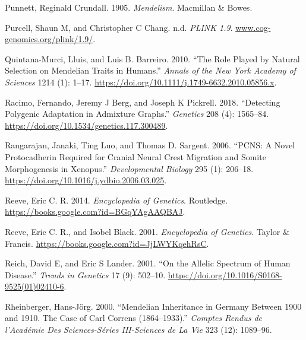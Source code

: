 \documentclass[
]{book}
\newlength{\cslhangindent}
\newlength{\cslentryspacingunit} %
\newenvironment{CSLReferences}[2] %
 {%
  \setlength{\parindent}{0pt}
  \ifodd #1
  \let\oldpar\par
  \def\par{\hangindent=\cslhangindent\oldpar}
  \fi
  \setlength{\parskip}{#2\cslentryspacingunit}
 }%
 {}
\begin{document}
\begin{CSLReferences}{1}{0}
\leavevmode{}%
Punnett, Reginald Crundall. 1905. \emph{Mendelism}. {Macmillan \& Bowes}.

\leavevmode{}%
Purcell, Shaun M, and Christopher C Chang. n.d. \emph{{PLINK} 1.9}. \href{https://www.cog-genomics.org/plink/1.9/}{www.cog-genomics.org/plink/1.9/}.

\leavevmode{}%
Quintana-Murci, Lluis, and Luis B. Barreiro. 2010. {``The Role Played by Natural Selection on {Mendelian} Traits in Humans.''} \emph{Annals of the New York Academy of Sciences} 1214 (1): 1--17. \url{https://doi.org/10.1111/j.1749-6632.2010.05856.x}.

\leavevmode{}%
Racimo, Fernando, Jeremy J Berg, and Joseph K Pickrell. 2018. {``Detecting {Polygenic Adaptation} in {Admixture Graphs}.''} \emph{Genetics} 208 (4): 1565--84. \url{https://doi.org/10.1534/genetics.117.300489}.

\leavevmode{}%
Rangarajan, Janaki, Ting Luo, and Thomas D. Sargent. 2006. {``{PCNS}: {A} Novel Protocadherin Required for Cranial Neural Crest Migration and Somite Morphogenesis in {Xenopus}.''} \emph{Developmental Biology} 295 (1): 206--18. \url{https://doi.org/10.1016/j.ydbio.2006.03.025}.

\leavevmode{}%
Reeve, Eric C. R. 2014. \emph{Encyclopedia of {Genetics}}. {Routledge}. \url{https://books.google.com?id=BGqYAgAAQBAJ}.

\leavevmode{}%
Reeve, Eric C. R., and Isobel Black. 2001. \emph{Encyclopedia of {Genetics}}. {Taylor \& Francis}. \url{https://books.google.com?id=JjLWYKqehRsC}.

\leavevmode{}%
Reich, David E, and Eric S Lander. 2001. {``On the Allelic Spectrum of Human Disease.''} \emph{Trends in Genetics} 17 (9): 502--10. \url{https://doi.org/10.1016/S0168-9525(01)02410-6}.

\leavevmode{}%
Rheinberger, Hans-Jörg. 2000. {``Mendelian Inheritance in {Germany} Between 1900 and 1910. {The} Case of {Carl Correns} (1864--1933).''} \emph{Comptes Rendus de l'Académie Des Sciences-Séries III-Sciences de La Vie} 323 (12): 1089--96.


\end{CSLReferences}
\end{document}
